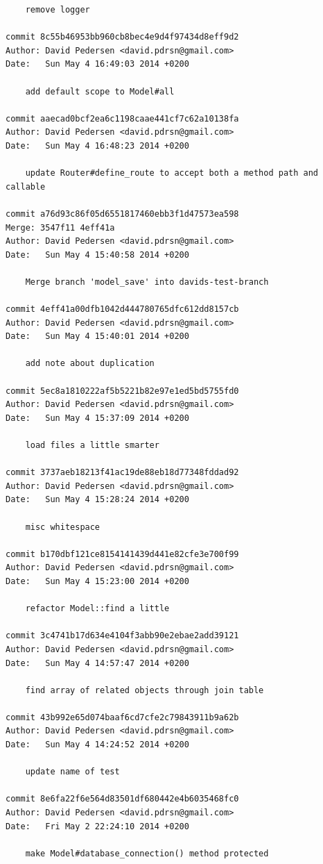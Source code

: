 \documentclass[12pt]{article}
\begin{document}
\begin{verbatim}
    remove logger

commit 8c55b46953bb960cb8bec4e9d4f97434d8eff9d2
Author: David Pedersen <david.pdrsn@gmail.com>
Date:   Sun May 4 16:49:03 2014 +0200

    add default scope to Model#all

commit aaecad0bcf2ea6c1198caae441cf7c62a10138fa
Author: David Pedersen <david.pdrsn@gmail.com>
Date:   Sun May 4 16:48:23 2014 +0200

    update Router#define_route to accept both a method path and callable

commit a76d93c86f05d6551817460ebb3f1d47573ea598
Merge: 3547f11 4eff41a
Author: David Pedersen <david.pdrsn@gmail.com>
Date:   Sun May 4 15:40:58 2014 +0200

    Merge branch 'model_save' into davids-test-branch

commit 4eff41a00dfb1042d444780765dfc612dd8157cb
Author: David Pedersen <david.pdrsn@gmail.com>
Date:   Sun May 4 15:40:01 2014 +0200

    add note about duplication

commit 5ec8a1810222af5b5221b82e97e1ed5bd5755fd0
Author: David Pedersen <david.pdrsn@gmail.com>
Date:   Sun May 4 15:37:09 2014 +0200

    load files a little smarter

commit 3737aeb18213f41ac19de88eb18d77348fddad92
Author: David Pedersen <david.pdrsn@gmail.com>
Date:   Sun May 4 15:28:24 2014 +0200

    misc whitespace

commit b170dbf121ce8154141439d441e82cfe3e700f99
Author: David Pedersen <david.pdrsn@gmail.com>
Date:   Sun May 4 15:23:00 2014 +0200

    refactor Model::find a little

commit 3c4741b17d634e4104f3abb90e2ebae2add39121
Author: David Pedersen <david.pdrsn@gmail.com>
Date:   Sun May 4 14:57:47 2014 +0200

    find array of related objects through join table

commit 43b992e65d074baaf6cd7cfe2c79843911b9a62b
Author: David Pedersen <david.pdrsn@gmail.com>
Date:   Sun May 4 14:24:52 2014 +0200

    update name of test

commit 8e6fa22f6e564d83501df680442e4b6035468fc0
Author: David Pedersen <david.pdrsn@gmail.com>
Date:   Fri May 2 22:24:10 2014 +0200

    make Model#database_connection() method protected


\end{verbatim}
\end{document}
